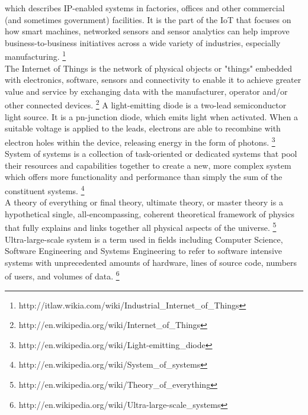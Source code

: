 \begin{acronym}
		which describes IP-enabled systems in factories, offices and other
		commercial (and sometimes government) facilities. It is the part of the
		\acs{IoT} that focuses on how smart machines, networked sensors and
		sensor analytics can help improve business-to-business initiatives
		across a wide variety of industries, especially manufacturing.
		\footnote{http://itlaw.wikia.com/wiki/Industrial\_Internet\_of\_Things}
	\\
		The Internet of Things is the network of physical objects or "things"
		embedded with electronics, software, sensors and connectivity to enable
		it to achieve greater value and service by exchanging data with the
		manufacturer, operator and/or other connected devices.
		\footnote{http://en.wikipedia.org/wiki/Internet\_of\_Things}
		A light-emitting diode is a two-lead semiconductor light source. It is
		a pn-junction diode, which emits light when activated. When a suitable
		voltage is applied to the leads, electrons are able to recombine with
		electron holes within the device, releasing energy in the form of
		photons.
		\footnote{http://en.wikipedia.org/wiki/Light-emitting\_diode}
	\\
		System of systems is a collection of task-oriented or dedicated systems
		that pool their resources and capabilities together to create a new,
		more complex system which offers more functionality and performance
		than simply the sum of the constituent systems.
		\footnote{http://en.wikipedia.org/wiki/System\_of\_systems}
	\\
		A theory of everything or final theory, ultimate theory, or master
		theory is a hypothetical single, all-encompassing, coherent theoretical
		framework of physics that fully explains and links together all
		physical aspects of the universe.
		\footnote{http://en.wikipedia.org/wiki/Theory\_of\_everything}
	\\
		Ultra-large-scale system is a term used in fields including Computer
		Science, Software Engineering and Systems Engineering to refer to
		software intensive systems with unprecedented amounts of hardware,
		lines of source code, numbers of users, and volumes of data.
		\footnote{http://en.wikipedia.org/wiki/Ultra-large-scale\_systems}
\end{acronym}